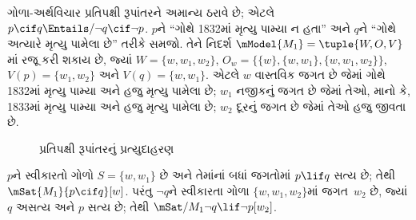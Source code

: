 \begin{ex}
  ગોળા-અર્થવિચાર પ્રતિપક્ષી રૂપાંતરને અમાન્ય ઠરાવે છે; એટલે $p
  \cif q \Entails/ \lnot q \cif \lnot p$. $p$ને ``ગોથે 1832માં
  મૃત્યુ પામ્યા ન હતા'' અને $q$ને ``ગોથે અત્યારે મૃત્યુ પામેલા છે''
  તરીકે સમજો. તેને નિદર્શ $\mModel{M_1} = \tuple{W, O, V}$માં
  રજૂ કરી શકાય છે, જ્યાં $W = \{w, w_1, w_2\}$,
  $O_w = \{\{w\}, \{w, w_1\}, \{w, w_1, w_2\}\}$,
  $V(p) = \{w_1, w_2\}$ અને $V(q) = \{w, w_1\}$. એટલે $w$
  વાસ્તવિક જગત છે જેમાં ગોથે 1832માં મૃત્યુ પામ્યા અને હજુ મૃત્યુ
  પામેલા છે; $w_1$ નજીકનું જગત છે જેમાં તેઓ, માનો કે, 1833માં
  મૃત્યુ પામ્યા અને હજુ મૃત્યુ પામેલા છે; $w_2$ દૂરનું જગત છે જેમાં
  તેઓ હજુ જીવતા છે.
\begin{figure}
\begin{center}
\caption{પ્રતિપક્ષી રૂપાંતરનું પ્રત્યુદાહરણ}
\end{center}
\end{figure}
$p$ને સ્વીકારતો ગોળો $S = \{w, w_1\}$ છે અને તેમાંનાં બધાં
જગતોમાં $p \lif q$ સત્ય છે; તેથી $\mSat{M_1}{p \cif q}[w]$.
પરંતુ $\lnot q$ને સ્વીકારતા ગોળા $\{w, w_1, w_2\}$માં જગત~$w_2$
છે, જ્યાં $q$ અસત્ય અને $p$ સત્ય છે; તેથી
$\mSat/{M_1}{\lnot q \lif \lnot p}[w_2]$.
\end{ex}
\endgroup


\OLEndChapterHook
\endgroup


\OLEndPartHook
